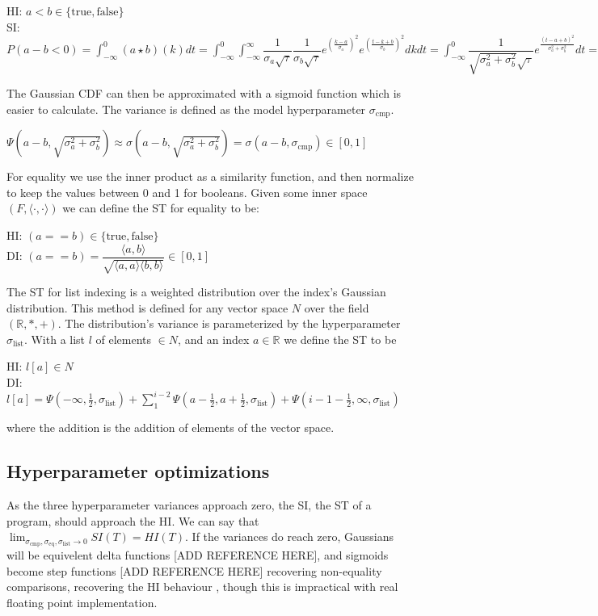 \documentclass{article}
\begin{document}
\begin{center}
  HI: $a < b \in \{\text{true}, \text{false}\}$\\
  SI: $P(a - b < 0) = \int_{-\infty}^0 (a \star b) (k) dt = \int_{-\infty}^0 \int_{-\infty}^{\infty} \dfrac{1}{\sigma_a \sqrt{\tau}} \dfrac{1}{\sigma_b \sqrt{\tau}} e^{(\frac{k - a}{\sigma_a})^2}e^{(\frac{t-k + b}{\sigma_b})^2} dk dt = \int_{-\infty}^0 \dfrac{1}{\sqrt{\sigma_a^2 + \sigma_b^2} \sqrt{\tau}} e^{\frac{(t - a + b)^2}{\sigma_a^2 + \sigma_b^2}}dt = \Psi(a - b, \sqrt{\sigma_a^2 + \sigma_b^2}) \in [0, 1]$
\end{center}
The Gaussian CDF can then be approximated with a sigmoid function which is easier to calculate. The variance is defined as the model hyperparameter $\sigma_{\text{cmp}}$.
\begin{center}
  $\Psi(a - b, \sqrt{\sigma_a^2 + \sigma_b^2}) \approx \sigma(a - b, \sqrt{\sigma_a^2 + \sigma_b^2}) = \sigma(a - b, \sigma_{\text{cmp}}) \in [0, 1]$
\end{center}
For equality we use the inner product as a similarity function, and then normalize to keep the values between 0 and 1 for booleans. Given some inner space $(F, \langle \cdot, \cdot \rangle)$ we can define the ST for equality to be:
\begin{center}
  HI: $(a == b) \in \{\text{true}, \text{false}\}$\\
  DI: $(a == b) = \dfrac{\langle a, b \rangle}{\sqrt{\langle a, a \rangle \langle b, b \rangle}} \in [0, 1]$
\end{center}
The ST for list indexing is a weighted distribution over the index's Gaussian distribution. This method is defined for any vector space $N$ over the field $(\mathbb{R}, *, +)$. The distribution's variance is parameterized by the hyperparameter $\sigma_{\text{list}}$. With a list $l$ of elements $\in N$, and an index $a \in \mathbb{R}$ we define the ST to be
\begin{center}
  HI: $l[a] \in N$\\
  DI: $l[a] = \Psi(-\infty, \frac{1}{2}, \sigma_{\text{list}}) + \sum_1^{i-2}\Psi(a-\frac{1}{2}, a+\frac{1}{2}, \sigma_{\text{list}}) + \Psi(i - 1 - \frac{1}{2}, \infty, \sigma_{\text{list}})$
\end{center}
where the addition is the addition of elements of the vector space.
\subsection*{Hyperparameter optimizations}
As the three hyperparameter variances approach zero, the SI, the ST of a program, should approach the HI. We can say that $\lim_{\sigma_{\text{cmp}}, \sigma_{\text{eq}}, \sigma_{\text{list}} \rightarrow 0} SI(T) = HI(T)$. If the variances do reach zero, Gaussians will be equivelent delta functions [ADD REFERENCE HERE], and sigmoids become step functions [ADD REFERENCE HERE] recovering non-equality comparisons, recovering the HI behaviour , though this is impractical with real floating point implementation.
\end{document}
